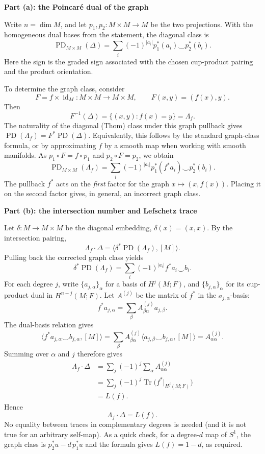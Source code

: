 \begin{solution}

\medskip
\noindent\textbf{Part (a): the Poincar\'e dual of the graph}\par
\smallskip

Write \(n=\dim M\), and let \(p_1,p_2:M\times M\to M\) be the two projections.
With the homogeneous dual bases from the statement, the diagonal class is
\[
\operatorname{PD}_{M\times M}(\Delta)
 =\sum_i(-1)^{|a_i|}
 p_1^*(a_i)\smile p_2^*(b_i).
\]
Here the sign is the graded sign associated with the chosen cup-product
pairing and the product orientation.

To determine the graph class, consider
\[
F=f\times\operatorname{id}_M:M\times M\longrightarrow M\times M,
\qquad F(x,y)=(f(x),y).
\]
Then
\[
F^{-1}(\Delta)=\{(x,y):f(x)=y\}=\Lambda_f.
\]
The naturality of the diagonal (Thom) class under this graph pullback gives
\(\operatorname{PD}(\Lambda_f)=F^*\operatorname{PD}(\Delta)\).
Equivalently, this follows by the standard graph-class formula, or by
approximating \(f\) by a smooth map when working with smooth manifolds.
As \(p_1\circ F=f\circ p_1\) and \(p_2\circ F=p_2\), we obtain
\[
\boxed{
\operatorname{PD}_{M\times M}(\Lambda_f)
 =\sum_i(-1)^{|a_i|}
 p_1^*(f^*a_i)\smile p_2^*(b_i).
}
\]
The pullback \(f^*\) acts on the \emph{first} factor for the graph
\(x\mapsto(x,f(x))\). Placing it on the second factor gives, in general,
an incorrect graph class.

\medskip
\noindent\textbf{Part (b): the intersection number and Lefschetz trace}\par
\smallskip

Let \(\delta:M\to M\times M\) be the diagonal embedding,
\(\delta(x)=(x,x)\). By the intersection pairing,
\[
\Lambda_f\cdot\Delta
 =\bigl\langle\delta^*\operatorname{PD}(\Lambda_f),[M]\bigr\rangle.
\]
Pulling back the corrected graph class yields
\[
\delta^*\operatorname{PD}(\Lambda_f)
 =\sum_i(-1)^{|a_i|}f^*a_i\smile b_i.
\]
For each degree \(j\), write \(\{a_{j,\alpha}\}_\alpha\) for a basis of
\(H^j(M;F)\), and \(\{b_{j,\alpha}\}_\alpha\) for its cup-product dual in
\(H^{n-j}(M;F)\). Let \(A^{(j)}\) be the matrix of \(f^*\) in the
\(a_{j,\alpha}\)-basis:
\[
f^*a_{j,\alpha}=\sum_\beta A^{(j)}_{\beta\alpha}a_{j,\beta}.
\]
The dual-basis relation gives
\[
\bigl\langle f^*a_{j,\alpha}\smile b_{j,\alpha},[M]\bigr\rangle
 =\sum_\beta A^{(j)}_{\beta\alpha}
  \bigl\langle a_{j,\beta}\smile b_{j,\alpha},[M]\bigr\rangle
 =A^{(j)}_{\alpha\alpha}.
\]
Summing over \(\alpha\) and \(j\) therefore gives
\[
\begin{aligned}
\Lambda_f\cdot\Delta
 &=\sum_j(-1)^j\sum_\alpha A^{(j)}_{\alpha\alpha}\\
 &=\sum_j(-1)^j\operatorname{Tr}\bigl(f^*|_{H^j(M;F)}\bigr)\\
 &=L(f).
\end{aligned}
\]
Hence
\[
\boxed{\Lambda_f\cdot\Delta=L(f).}
\]
No equality between traces in complementary degrees is needed (and it is
not true for an arbitrary self-map). As a quick check, for a degree-\(d\)
map of \(S^1\), the graph class is
\(p_2^*u-d\,p_1^*u\) and the formula gives \(L(f)=1-d\), as required.


\end{solution}
